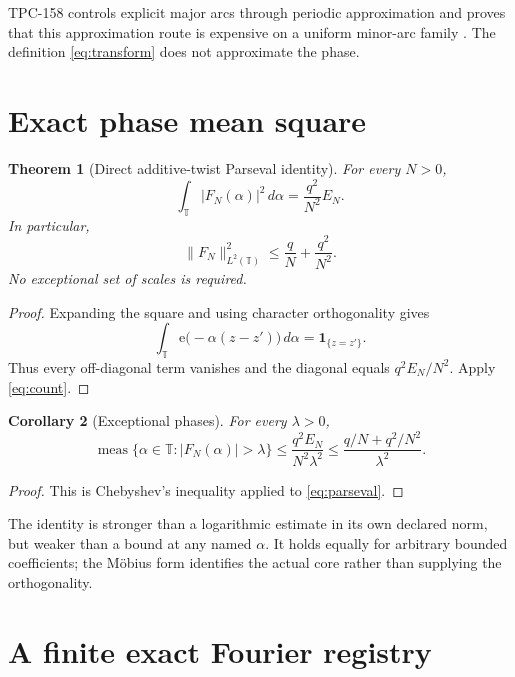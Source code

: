 \documentclass[11pt]{article}
\newtheorem{theorem}{Theorem}[section]
\newtheorem{corollary}[theorem]{Corollary}
\theoremstyle{definition}
\newcommand{\e}{\mathrm e}
\newcommand{\T}{\mathbb T}
\newcommand{\norm}[1]{\lVert#1\rVert}
\begin{document}
TPC-158 controls explicit major arcs through periodic approximation
and proves that this approximation route is expensive on a uniform
minor-arc family \citep{WangTPC158}.  The definition
\eqref{eq:transform} does not approximate the phase.

\section{Exact phase mean square}

\begin{theorem}[Direct additive-twist Parseval identity]\label{thm:parseval}
For every \(N>0\),
\begin{equation}
 \boxed{\quad
 \int_{\T}|F_N(\alpha)|^2\,d\alpha
 =\frac{q^2}{N^2}E_N.
 \quad}
\label{eq:parseval}
\end{equation}
In particular,
\begin{equation}
 \norm{F_N}_{L^2(\T)}^2
 \le\frac qN+\frac{q^2}{N^2}.
\label{eq:l2bound}
\end{equation}
No exceptional set of scales is required.
\end{theorem}

\begin{proof}
Expanding the square and using character orthogonality gives
\[
 \int_{\T}\e\bigl(-\alpha(z-z')\bigr)\,d\alpha
 =\mathbf1_{\{z=z'\}}.
\]
Thus every off-diagonal term vanishes and the diagonal equals
\(q^2E_N/N^2\).  Apply \eqref{eq:count}.
\end{proof}

\begin{corollary}[Exceptional phases]\label{cor:measure}
For every \(\lambda>0\),
\begin{equation}
 \operatorname{meas}\{\alpha\in\T:|F_N(\alpha)|>\lambda\}
 \le
 \frac{q^2E_N}{N^2\lambda^2}
 \le
 \frac{q/N+q^2/N^2}{\lambda^2}.
\label{eq:chebyshev}
\end{equation}
\end{corollary}

\begin{proof}
This is Chebyshev's inequality applied to \eqref{eq:parseval}.
\end{proof}

The identity is stronger than a logarithmic estimate in its own
declared norm, but weaker than a bound at any named \(\alpha\).
It holds equally for arbitrary bounded coefficients; the
M\"obius form identifies the actual core rather than supplying the
orthogonality.

\section{A finite exact Fourier registry}
\end{document}
